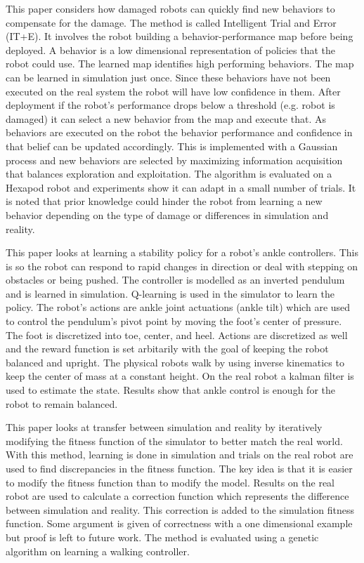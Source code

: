 \documentclass[12 pt]{article}
\begin{document}
This paper considers how damaged robots can quickly find new behaviors to compensate for the damage. The method is called Intelligent Trial and Error (IT+E). It involves the robot building a behavior-performance map before being deployed. A behavior is a low dimensional representation of policies that the robot could use. The learned map identifies high performing behaviors. The map can be learned in simulation just once. Since these behaviors have not been executed on the real system the robot will have low confidence in them. After deployment if the robot's performance drops below a threshold (e.g. robot is damaged) it can select a new behavior from the map and execute that. As behaviors are executed on the robot the behavior performance and confidence in that belief can be updated accordingly. This is implemented with a Gaussian process and new behaviors are selected by maximizing information acquisition that balances exploration and exploitation. The algorithm is evaluated on a Hexapod robot and experiments show it can adapt in a small number of trials. It is noted that prior knowledge could hinder the robot from learning a new behavior depending on the type of damage or differences in simulation and reality. \cite{cully2015robots}

This paper looks at learning a stability policy for a robot's ankle controllers. This is so the robot can respond to rapid changes in direction or deal with stepping on obstacles or being pushed. The controller is modelled as an inverted pendulum and is learned in simulation. Q-learning is used in the simulator to learn the policy. The robot's actions are ankle joint actuations (ankle tilt) which are used to control the pendulum's pivot point by moving the foot's center of pressure. The foot is discretized into toe, center, and heel. Actions are discretized as well and the reward function is set arbitarily with the goal of keeping the robot balanced and upright. The physical robots walk by using inverse kinematics to keep the center of mass at a constant height. On the real robot a kalman filter is used to estimate the state. Results show that ankle control is enough for the robot to remain balanced. \cite{hengst2011learning}

This paper looks at transfer between simulation and reality by iteratively modifying the fitness function of the simulator to better match the real world. With this method, learning is done in simulation and trials on the real robot are used to find discrepancies in the fitness function. The key idea is that it is easier to modify the fitness function than to modify the model. Results on the real robot are used to calculate a correction function which represents the difference between simulation and reality. This correction is added to the simulation fitness function. Some argument is given of correctness with a one dimensional example but proof is left to future work. The method is evaluated using a genetic algorithm on learning a walking controller.\cite{iocchi2007learning}
\end{document}
